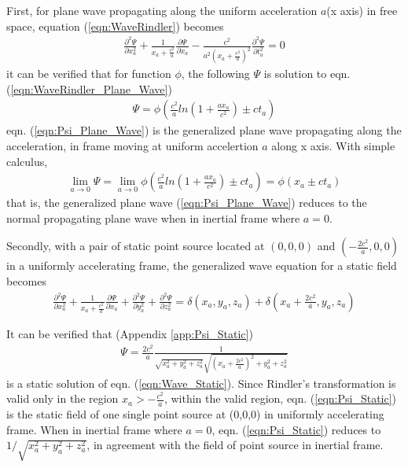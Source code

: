 \documentclass[prd,showpacs,preprint]{revtex4-1}
\begin{document}
First, for plane wave propagating along the uniform acceleration $a$(x axis) in free space, equation (\ref{eqn:WaveRindler}) becomes
\begin{eqnarray}
\frac{\partial^2 \Psi}{\partial x_a^2} + \frac{1}{x_a+\frac{c^2}{a}}\frac{\partial \Psi}{\partial x_a} - \frac{c^2}{a^2(x_a+\frac{c^2}{a})^2}\frac{\partial^2 \Psi}{\partial t_a^2}=0
\label{eqn:WaveRindler_Plane_Wave}
\end{eqnarray}
it can be verified that for function $\phi$, the following $\Psi$ is solution to eqn. (\ref{eqn:WaveRindler_Plane_Wave})
\begin{eqnarray}
\Psi=\phi(\frac{c^2}{a}ln(1+\frac{ax_a}{c^2}) \pm ct_a)
\label{eqn:Psi_Plane_Wave}
\end{eqnarray}
eqn. (\ref{eqn:Psi_Plane_Wave}) is the generalized plane wave propagating along the acceleration, in frame moving at uniform accelertion $a$ along x axis. With simple calculus,
\begin{eqnarray}
\lim_{a\to 0}\Psi=\lim_{a\to 0}\phi(\frac{c^2}{a}ln(1+\frac{ax_a}{c^2}) \pm ct_a)=\phi(x_a\pm ct_a)
\label{eqn:Psi_Plane_Wave_Inertial}
\end{eqnarray}
that is, the generalized plane wave (\ref{eqn:Psi_Plane_Wave}) reduces to the normal propagating plane wave when in inertial frame where $a=0$.

Secondly, with a pair of static point source located at $(0,0,0)$ and $(-\frac{2c^2}{a},0,0)$ in a uniformly accelerating frame, the generalized wave equation for a static field becomes
\begin{eqnarray}
\frac{\partial^2 \Psi}{\partial x_a^2} + \frac{1}{x_a+\frac{c^2}{a}}\frac{\partial \Psi}{\partial x_a} + \frac{\partial^2 \Psi}{\partial y_a^2} + \frac{\partial^2 \Psi}{\partial z_a^2} =\delta(x_a,y_a,z_a)+\delta(x_a+\frac{2c^2}{a},y_a,z_a)
\label{eqn:Wave_Static}
\end{eqnarray}

It can be verified that (Appendix \ref{app:Psi_Static})
\begin{eqnarray}
\Psi= \frac{2c^2}{a}\frac{1}{\sqrt{x_a^2+y_a^2+z_a^2}\sqrt{(x_a+\frac{2c^2}{a})^2+y_a^2+z_a^2}}
\label{eqn:Psi_Static}
\end{eqnarray}
is a static solution of eqn. (\ref{eqn:Wave_Static}). Since Rindler's transformation is valid only in the region $x_a>-\frac{c^2}{a}$, within the valid region, eqn. (\ref{eqn:Psi_Static}) is the static field of one single point source at (0,0,0) in uniformly accelerating frame. When in inertial frame where $a=0$, eqn. (\ref{eqn:Psi_Static}) reduces to $1/\sqrt{x_a^2+y_a^2+z_a^2}$, in agreement with the field of point source in inertial frame.
\end{document}
